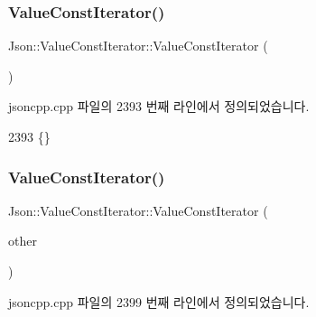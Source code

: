 \subsubsection{\texorpdfstring{Value\+Const\+Iterator()}{ValueConstIterator()}\hspace{0.1cm}{\footnotesize\ttfamily [1/3]}}
{\footnotesize\ttfamily Json\+::\+Value\+Const\+Iterator\+::\+Value\+Const\+Iterator (\begin{DoxyParamCaption}{ }\end{DoxyParamCaption})}



jsoncpp.\+cpp 파일의 2393 번째 라인에서 정의되었습니다.


\begin{DoxyCode}
2393 \{\}
\end{DoxyCode}
\mbox{\label{class_json_1_1_value_const_iterator_a7ef3df204a9ae83a0d8a3cd128e05c70}} 
\subsubsection{\texorpdfstring{Value\+Const\+Iterator()}{ValueConstIterator()}\hspace{0.1cm}{\footnotesize\ttfamily [2/3]}}
{\footnotesize\ttfamily Json\+::\+Value\+Const\+Iterator\+::\+Value\+Const\+Iterator (\begin{DoxyParamCaption}\item[{\hyperlink{class_json_1_1_value_iterator}{Value\+Iterator} const \&}]{other }\end{DoxyParamCaption})}



jsoncpp.\+cpp 파일의 2399 번째 라인에서 정의되었습니다.


